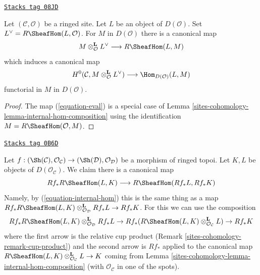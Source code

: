\begin{lemma}[Dual]
\label{sites-cohomology-lemma-dual}
\href{https://stacks.math.columbia.edu/tag/08JD}{\texttt{Stacks tag 08JD}}

Let $(\mathcal{C}, \mathcal{O})$ be a ringed site. Let $L$ be an
object of $D(\mathcal{O})$. Set $L^\vee = R\SheafHom(L, \mathcal{O})$.
For $M$ in $D(\mathcal{O})$ there is a canonical map
\begin{equation}
\label{equation-eval}
M \otimes^\mathbf{L}_\mathcal{O} L^\vee \longrightarrow R\SheafHom(L, M)
\end{equation}
which induces a canonical map
$$
H^0(\mathcal{C}, M \otimes_\mathcal{O}^\mathbf{L} L^\vee)
\longrightarrow
\Hom_{D(\mathcal{O})}(L, M)
$$
functorial in $M$ in $D(\mathcal{O})$.
\end{lemma}

\begin{proof}
The map (\ref{equation-eval}) is a special case of
Lemma \ref{sites-cohomology-lemma-internal-hom-composition}
using the identification $M = R\SheafHom(\mathcal{O}, M)$.
\end{proof}

\begin{remark}
\label{sites-cohomology-remark-projection-formula-for-internal-hom}
\href{https://stacks.math.columbia.edu/tag/0B6D}{\texttt{Stacks tag 0B6D}}

Let $f : (\Sh(\mathcal{C}), \mathcal{O}_\mathcal{C}) \to
(\Sh(\mathcal{D}), \mathcal{O}_\mathcal{D})$ be a morphism of ringed topoi.
Let $K, L$ be objects of $D(\mathcal{O}_\mathcal{C})$. We claim there is
a canonical map
$$
Rf_*R\SheafHom(L, K) \longrightarrow R\SheafHom(Rf_*L, Rf_*K)
$$
Namely, by (\ref{equation-internal-hom}) this is the same thing
as a map
$Rf_*R\SheafHom(L, K) \otimes_{\mathcal{O}_\mathcal{D}}^\mathbf{L} Rf_*L
\to Rf_*K$.
For this we can use the composition
$$
Rf_*R\SheafHom(L, K) \otimes_{\mathcal{O}_\mathcal{D}}^\mathbf{L} Rf_*L \to
Rf_*(R\SheafHom(L, K) \otimes_{\mathcal{O}_\mathcal{C}}^\mathbf{L} L) \to
Rf_*K
$$
where the first arrow is the relative cup product
(Remark \ref{sites-cohomology-remark-cup-product}) and the second arrow is $Rf_*$ applied
to the canonical map
$R\SheafHom(L, K) \otimes_{\mathcal{O}_\mathcal{C}}^\mathbf{L} L \to K$
coming from Lemma \ref{sites-cohomology-lemma-internal-hom-composition}
(with $\mathcal{O}_\mathcal{C}$ in one of the spots).
\end{remark}

